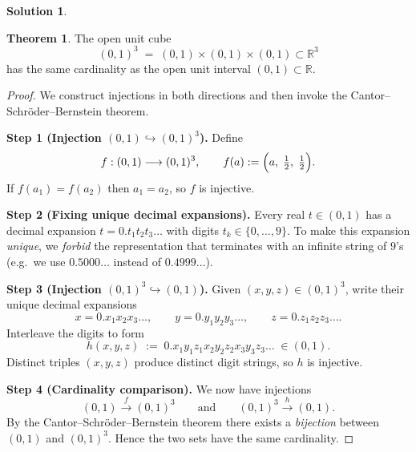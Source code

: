 \documentclass[12pt]{article}
\theoremstyle{definition} %
\newtheorem{solution}{Solution}
\newtheorem{theorem}{Theorem}
\theoremstyle{plain} %
\begin{document}
      \begin{solution}
        \begin{theorem}
          The open unit cube
          \[
            (0,1)^3 \;=\; (0,1)\times(0,1)\times(0,1)\subset\mathbb R^{3}
          \]
          has the same cardinality as the open unit interval $(0,1)\subset\mathbb R$.
          \end{theorem}
          
          \begin{proof}
          We construct injections in both directions and then invoke the
          Cantor--Schröder--Bernstein theorem.
          
          \medskip
          \textbf{Step 1 (Injection $(0,1)\hookrightarrow(0,1)^3$).}
          Define
          \[
            f:(0,1)\longrightarrow(0,1)^3,
            \qquad
            f(a):=\Bigl(a,\;\tfrac12,\;\tfrac12\Bigr).
          \]
          If $f(a_1)=f(a_2)$ then $a_1=a_2$, so $f$ is injective.
          
          \medskip
          \textbf{Step 2 (Fixing unique decimal expansions).}
          Every real $t\in(0,1)$ has a decimal expansion  
          $t=0.t_1t_2t_3\ldots$ with digits $t_k\in\{0,\dots,9\}$.
          To make this expansion \emph{unique}, we \emph{forbid}
          the representation that terminates with an infinite string of $9$’s
          (e.g.\ we use $0.5000\ldots$ instead of $0.4999\ldots$).
          
          \medskip
          \textbf{Step 3 (Injection $(0,1)^3\hookrightarrow(0,1)$).}
          Given $(x,y,z)\in(0,1)^3$, write their unique decimal expansions
          \[
            x=0.x_1x_2x_3\ldots,\qquad
            y=0.y_1y_2y_3\ldots,\qquad
            z=0.z_1z_2z_3\ldots .
          \]
          Interleave the digits to form
          \[
            h(x,y,z)\;:=\;0.x_1y_1z_1x_2y_2z_2x_3y_3z_3\ldots\;\in(0,1).
          \]
          Distinct triples $(x,y,z)$ produce distinct digit strings,
          so $h$ is injective.
          
          \medskip
          \textbf{Step 4 (Cardinality comparison).}
          We now have injections
          \[
            (0,1)\xrightarrow{\;f\;}(0,1)^3
            \qquad\text{and}\qquad
            (0,1)^3\xrightarrow{\;h\;}(0,1).
          \]
          By the Cantor--Schröder--Bernstein theorem there exists a \emph{bijection}
          between $(0,1)$ and $(0,1)^3$.
          Hence the two sets have the same cardinality.
          \end{proof}        
      \end{solution}
\end{document}
